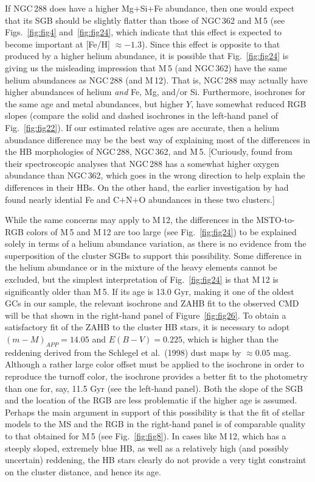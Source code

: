 \documentclass[12pt,preprint]{aastex}
\begin{document}
If NGC$\,$288 does have a higher Mg$+$Si$+$Fe abundance, then one would expect
that its SGB should be slightly flatter than those of NGC$\,$362 and M$\,$5
(see Figs.~\ref{fig:fig4} and~\ref{fig:fig24}, which indicate that this effect
is expected to become important at [Fe/H] $\approx -1.3$).  Since this effect
is opposite to that produced by a higher helium abundance, it is possible that
Fig.~\ref{fig:fig24} is giving us the misleading impression that M$\,$5 (and
NGC$\,$362) have the same helium abundances as NGC$\,$288 (and M$\,$12).
That is, NGC$\,$288 may actually have higher abundances of helium {\it and} Fe,
Mg, and/or Si.  Furthermore, isochrones for the same age and metal abundances,
but higher $Y$, have somewhat reduced RGB slopes (compare the solid and dashed
isochrones in the left-hand panel of Fig.~\ref{fig:fig22}).  If our estimated
relative ages are accurate, then a helium abundance difference may be the best
way of explaining most of the differences in the HB morphologies of NGC$\,$288,
NGC$\,$362, and M$\,$5.  [Curiously, \citet{sk00} found from their spectroscopic
analyses that NGC$\,$288 has a somewhat higher oxygen abundance than NGC$\,$362,
which goes in the wrong direction to help explain the differences in their HBs.
On the other hand, the earlier investigation by \citet{dcc91} had found nearly
idential Fe and C$+$N$+$O abundances in these two clusters.]

While the same concerns may apply to M$\,$12, the differences in the
MSTO-to-RGB colors of M$\,$5 and M$\,$12 are too large (see
Fig.~\ref{fig:fig24}) to be explained solely in terms of a helium abundance
variation, as there is no evidence from the superposition of the cluster SGBs
to support this possibility.  Some difference in the helium abundance or in the
mixture of the heavy elements cannot be excluded, but the simplest
interpretation of Fig.~\ref{fig:fig24} is that M$\,$12 is significantly
older than M$\,$5.  If its age is 13.0 Gyr, making it one of the oldest GCs in
our sample, the relevant isochrone and ZAHB fit to the observed CMD will be that
shown in the right-hand panel of Figure~\ref{fig:fig26}.  To obtain a
satisfactory fit of the ZAHB to the cluster HB stars, it is necessary to adopt
$(m-M)_{APP} = 14.05$ and $E(B-V) = 0.225$, which is higher than the reddening
derived from the Schlegel et al.~(1998) dust maps by $\approx 0.05$ mag.
Although a rather large color offset must be applied to the isochrone in order
to reproduce the turnoff color, the isochrone provides a better fit to
the photometry than one for, say, 11.5 Gyr (see the left-hand panel).  Both the
slope of the SGB and the location of the RGB are less problematic if the higher
age is assumed.  Perhaps the main argument in support of this possibility is
that the fit of stellar models to the MS and the RGB in the right-hand panel is
of comparable quality to that obtained for M$\,$5 (see Fig.~\ref{fig:fig8}).
In cases like M$\,$12, which has a steeply sloped, extremely blue HB, as
well as a relatively high (and possibly uncertain) reddening, the HB stars
clearly do not provide a very tight constraint on the cluster distance, and
hence its age.
\end{document}
